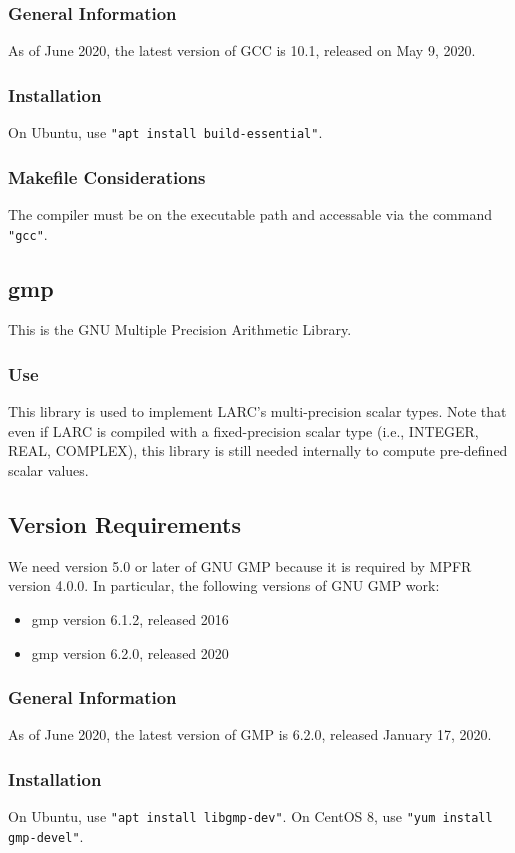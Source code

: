 \documentclass{article}
\begin{document}
\subsubsection{General Information}
As of June 2020, the latest version of GCC is 10.1,
released on May 9, 2020.
\subsubsection{Installation}
On Ubuntu, use {\tt "apt install build-essential"}.
\subsubsection{Makefile Considerations}
The compiler must be on the executable path and accessable
via the command \texttt{"gcc"}.

\subsection{gmp}
This is the GNU Multiple Precision Arithmetic Library.
\subsubsection{Use}
This library is used to implement LARC's multi-precision
scalar types.
Note that even if LARC is compiled with a fixed-precision
scalar type (i.e., INTEGER, REAL, COMPLEX), this library
is still needed internally to compute pre-defined scalar
values.
\subsection{Version Requirements}
We need version 5.0 or later of GNU GMP because it
is required by MPFR version 4.0.0.
In particular, the following versions of GNU GMP work:
\begin{itemize}
\item gmp version 6.1.2, released 2016
\item gmp version 6.2.0, released 2020
\end{itemize}
\subsubsection{General Information}
As of June 2020, the latest version of GMP is 6.2.0,
released January 17, 2020.
\subsubsection{Installation}
On Ubuntu, use {\tt "apt install libgmp-dev"}.
On CentOS 8, use {\tt "yum install gmp-devel"}.
\end{document}
